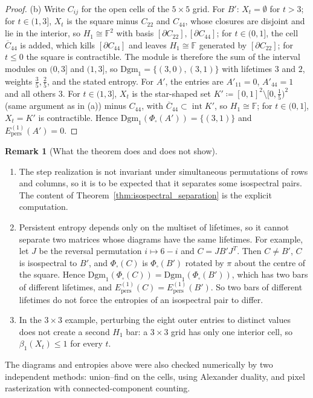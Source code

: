 \documentclass[11pt,a4paper,reqno]{amsart}
\theoremstyle{definition}
\newtheorem{remark}[theorem]{Remark}
\numberwithin{equation}{section}
\begin{document}
\begin{proof}
(b) Write $C_{ij}$ for the open cells of the $5 \times 5$ grid. For $B'$: $X_t = \emptyset$ for $t > 3$; for $t \in (1, 3]$, $X_t$ is the square minus $C_{22}$ and $C_{44}$, whose closures are disjoint and lie in the interior, so $H_1 \cong \mathbb{F}^2$ with basis $[\partial C_{22}], [\partial C_{44}]$; for $t \in (0, 1]$, the cell $\overline{C}_{44}$ is added, which kills $[\partial C_{44}]$ and leaves $H_1 \cong \mathbb{F}$ generated by $[\partial C_{22}]$; for $t \le 0$ the square is contractible. The module is therefore the sum of the interval modules on $(0,3]$ and $(1,3]$, so $\mathrm{Dgm}_1 = \{(3,0),(3,1)\}$ with lifetimes $3$ and $2$, weights $\frac35, \frac25$, and the stated entropy. For $A'$, the entries are $A'_{11} = 0$, $A'_{44} = 1$ and all others $3$. For $t \in (1,3]$, $X_t$ is the star-shaped set $K' \coloneqq [0,1]^2 \setminus [0, \frac15)^2$ (same argument as in (a)) minus $C_{44}$, with $\overline{C}_{44} \subset \operatorname{int} K'$, so $H_1 \cong \mathbb{F}$; for $t \in (0,1]$, $X_t = K'$ is contractible. Hence $\mathrm{Dgm}_1(\Phi_\square(A')) = \{(3,1)\}$ and $E^{(1)}_{\mathrm{pers}}(A') = 0$.
\end{proof}

\begin{remark}[What the theorem does and does not show]
\label{rem:entropy_limits}
\begin{enumerate}[label=(\roman*)]
    \item The step realization is not invariant under simultaneous permutations of rows and columns, so it is to be expected that it separates some isospectral pairs. The content of Theorem~\ref{thm:isospectral_separation} is the explicit computation.
    \item Persistent entropy depends only on the multiset of lifetimes, so it cannot separate two matrices whose diagrams have the same lifetimes. For example, let $J$ be the reversal permutation $i \mapsto 6 - i$ and $C = JB'J^T$. Then $C \ne B'$, $C$ is isospectral to $B'$, and $\Phi_\square(C)$ is $\Phi_\square(B')$ rotated by $\pi$ about the centre of the square. Hence $\mathrm{Dgm}_1(\Phi_\square(C)) = \mathrm{Dgm}_1(\Phi_\square(B'))$, which has two bars of different lifetimes, and $E^{(1)}_{\mathrm{pers}}(C) = E^{(1)}_{\mathrm{pers}}(B')$. So two bars of different lifetimes do not force the entropies of an isospectral pair to differ.
    \item In the $3 \times 3$ example, perturbing the eight outer entries to distinct values does not create a second $H_1$ bar: a $3 \times 3$ grid has only one interior cell, so $\beta_1(X_t) \le 1$ for every $t$.
\end{enumerate}
The diagrams and entropies above were also checked numerically by two independent methods: union--find on the cells, using Alexander duality, and pixel rasterization with connected-component counting.
\end{remark}
\end{document}
